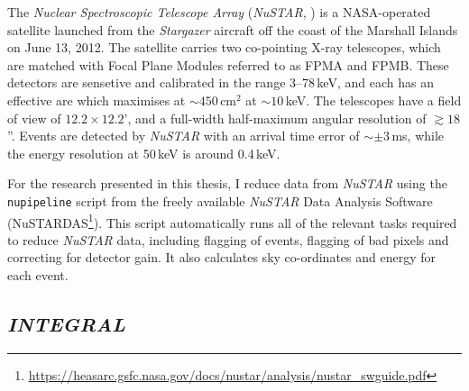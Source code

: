\par The \textit{Nuclear Spectroscopic Telescope Array} (\textit{NuSTAR}, \citealp{Harrison_NuStar}) is a NASA-operated satellite launched from the \textit{Stargazer} aircraft off the coast of the Marshall Islands on June 13, 2012.  The satellite carries two co-pointing X-ray telescopes, which are matched with Focal Plane Modules referred to as FPMA and FPMB.  These detectors are sensetive and calibrated in the range 3--78\,keV, and each has an effective are which maximises at $\sim450$\,cm$^2$ at $\sim10$\,keV.  The telescopes have a field of view of $12.2\times12.2$', and a full-width half-maximum angular resolution of $\gtrsim18$''.  Events are detected by \textit{NuSTAR} with an arrival time error of $\sim\pm3$\,ms, while the energy resolution at 50\,keV is around 0.4\,keV.
\par For the research presented in this thesis, I reduce data from \textit{NuSTAR} using the \texttt{nupipeline} script from the freely available \textit{NuSTAR} Data Analysis Software (NuSTARDAS\footnote{\url{https://heasarc.gsfc.nasa.gov/docs/nustar/analysis/nustar_swguide.pdf}}).  This script automatically runs all of the relevant tasks required to reduce \textit{NuSTAR} data, including flagging of events, flagging of bad pixels and correcting for detector gain.  It also calculates sky co-ordinates and energy for each event.

\subsection{\textit{INTEGRAL}}

